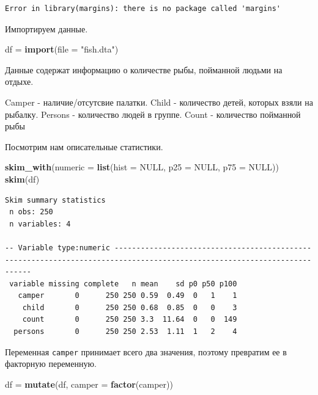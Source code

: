 \documentclass[]{book}
\newenvironment{Shaded}{\begin{snugshade}}{\end{snugshade}}
\newcommand{\DataTypeTok}[1]{\textcolor[rgb]{0.13,0.29,0.53}{#1}}
\newcommand{\KeywordTok}[1]{\textcolor[rgb]{0.13,0.29,0.53}{\textbf{#1}}}
\newcommand{\NormalTok}[1]{#1}
\newcommand{\OtherTok}[1]{\textcolor[rgb]{0.56,0.35,0.01}{#1}}
\newcommand{\StringTok}[1]{\textcolor[rgb]{0.31,0.60,0.02}{#1}}
\begin{document}
\begin{verbatim}
Error in library(margins): there is no package called 'margins'
\end{verbatim}

Импортируем данные.

\begin{Shaded}
\begin{Highlighting}[]
\NormalTok{df =}\StringTok{ }\KeywordTok{import}\NormalTok{(}\DataTypeTok{file =} \StringTok{"fish.dta"}\NormalTok{)}
\end{Highlighting}
\end{Shaded}

Данные содержат информацию о количестве рыбы, пойманной людьми на отдыхе.

Camper - наличие/отсутсвие палатки.
Child - количество детей, которых взяли на рыбалку.
Persons - количество людей в группе.
Count - количество пойманной рыбы

Посмотрим нам описательные статистики.

\begin{Shaded}
\begin{Highlighting}[]
\KeywordTok{skim_with}\NormalTok{(}\DataTypeTok{numeric =} \KeywordTok{list}\NormalTok{(}\DataTypeTok{hist =} \OtherTok{NULL}\NormalTok{, }\DataTypeTok{p25 =} \OtherTok{NULL}\NormalTok{, }\DataTypeTok{p75 =} \OtherTok{NULL}\NormalTok{))}
\KeywordTok{skim}\NormalTok{(df)}
\end{Highlighting}
\end{Shaded}

\begin{verbatim}
Skim summary statistics
 n obs: 250 
 n variables: 4 

-- Variable type:numeric -------------------------------------------------------------------------------------------------------------------------
 variable missing complete   n mean    sd p0 p50 p100
   camper       0      250 250 0.59  0.49  0   1    1
    child       0      250 250 0.68  0.85  0   0    3
    count       0      250 250 3.3  11.64  0   0  149
  persons       0      250 250 2.53  1.11  1   2    4
\end{verbatim}

Переменная \texttt{camper} принимает всего два значения, поэтому превратим ее в факторную переменную.

\begin{Shaded}
\begin{Highlighting}[]
\NormalTok{df =}\StringTok{ }\KeywordTok{mutate}\NormalTok{(df, }\DataTypeTok{camper =} \KeywordTok{factor}\NormalTok{(camper))}
\end{Highlighting}
\end{Shaded}
\end{document}
